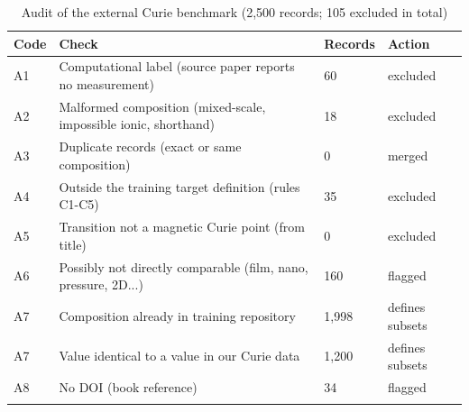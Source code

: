 \begin{table}[h]
\caption{Audit of the external Curie benchmark (2,500 records; 105 excluded in total)}
\label{tab:tableS1_benchmark_audit}
\begin{tabular*}{\textwidth}{@{\extracolsep\fill}llll}
\toprule
Code & Check & Records & Action \\
\midrule
A1 & Computational label (source paper reports no measurement) & 60 & excluded \\
A2 & Malformed composition (mixed-scale, impossible ionic, shorthand) & 18 & excluded \\
A3 & Duplicate records (exact or same composition) & 0 & merged \\
A4 & Outside the training target definition (rules C1-C5) & 35 & excluded \\
A5 & Transition not a magnetic Curie point (from title) & 0 & excluded \\
A6 & Possibly not directly comparable (film, nano, pressure, 2D...) & 160 & flagged \\
A7 & Composition already in training repository & 1,998 & defines subsets \\
A7 & Value identical to a value in our Curie data & 1,200 & defines subsets \\
A8 & No DOI (book reference) & 34 & flagged \\
\botrule
\end{tabular*}
\end{table}
